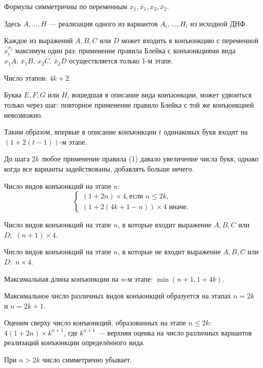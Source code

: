 \documentclass[12pt,a4paper,oneside,fleqn,leqno]{article}
\theoremstyle{definition}
\begin{document}
			Формулы симметричны по переменным $x_1, \bar{x}_1, x_2, \bar{x}_2.$\par
			Здесь $A, \ldots, H$ --- реализация одного из вариантов $A_i, \ldots, H_i$ из исходной ДНФ.\par
			Каждое из выражений $A, B, C$ или $D$ может входить в конъюнкцию с переменной $x_i^{\sigma_i}$ максимум один раз: применение правила Блейка с конъюнкциями вида $x_1A,\,\bar{x}_1B, \,x_2C, \,\bar{x}_2D$ осуществляется только 1-м этапе. \par
			Число этапов: $4k + 2.$\par
			Буква $E, F, G$ или $H$, вошедшая в описание вида конъюнкции, может удвоиться только через шаг: повторное применение правило Блейка с той же конъюнкцией невозможно.\par
			Таким образом, впервые в описание конъюнкции $t$ одинаковых букв входят на $(1 + 2(t - 1))$-м этапе.\par
			До шага $2k$ любое применение правила (1) давало увеличение числа букв, однако когда все варианты задействованы, добавлять больше нечего.\par
			Число видов конъюнкций на этапе $n:$ 
			$$
				\begin{cases}
					(1 + 2n)\times4, \text{если $n \leqslant 2k,$}\\
					(1 + 2(4k + 1 - n))\times4 \text{ иначе.}
				\end{cases}
			$$\par
			Число видов конъюнкций на этапе $n$, в которые входит выражение $A, B, C$ или $D:$ $(n + 1)\times4.$\par
			Число видов конъюнкций на этапе $n$, в которые не входит выражение $A, B, C$ или $D:$ $n\times4.$\par
			Максимальная длина конъюнкции на $n$-м этапе: $\min(n + 1, 1 + 4k)$.\par
			Максимальное число различных видов конъюнкций образуется на этапах $n = 2k$ и $n = 2k + 1$.\par
			Оценим сверху число конъюнкций, образованных на этапе $n \leqslant 2k:$ $4(1 + 2n) \times k^{n + 1}$, где $k^{n + 1}$ --- верхняя оценка на число различных вариантов реализаций конъюнкции определённого вида.\par
			При $n > 2k$ число симметрично убывает.\par
\end{document}
